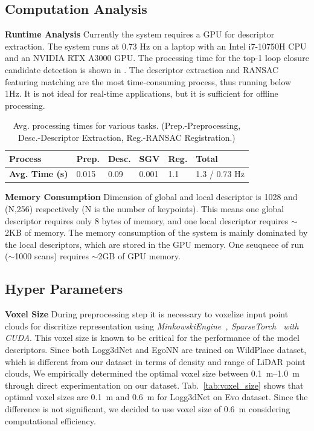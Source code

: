 \subsection*{Computation Analysis}
\textbf{Runtime Analysis}\hspace{0.5em} Currently the system requires a GPU for descriptor extraction. The system runs at 0.73 Hz on a laptop with an Intel i7-10750H CPU and an NVIDIA RTX A3000 GPU. The processing time for the top-1 loop closure candidate detection is shown in . The descriptor extraction and RANSAC featuring matching are the most time-consuming process, thus running below 1Hz. It is not ideal for real-time applications, but it is sufficient for offline processing. 
\begin{table}[h]
  \centering
  \small
  \begin{tabular}{@{}llllll@{}}
  \toprule
  \textbf{Process} & \textbf{Prep.} & \textbf{Desc.} & \textbf{SGV} & \textbf{Reg.} & \textbf{Total} \\ \midrule
  \textbf{Avg. Time (s)} & 0.015 & 0.09 & 0.001 & 1.1 & 1.3 / 0.73 Hz \\
  \bottomrule
  \end{tabular}
  \caption{Avg. processing times for various tasks. (Prep.-Preprocessing, Desc.-Descriptor Extraction, Reg.-RANSAC Registration.)}
  \label{tab:my-table}
\end{table}
\newline
\textbf{Memory Consumption}\hspace{0.5em} Dimension of global and local descriptor is 1028 and (N,256) respectively (N is the number of keypoints). This means one global descriptor requires only 8 bytes of memory, and one local descriptor requires $\sim$2KB of memory. The memory consumption of the system is mainly dominated by the local descriptors, which are stored in the GPU memory. One seuqnece of run ($\sim$1000 scans) requires $\sim$2GB of GPU memory.

\subsection*{Hyper Parameters}
\textbf{Voxel Size}\hspace{0.5em} During preprocessing step it is necessary to voxelize input point clouds for discritize representation using \emph{MinkowskiEngine~\cite{choy20194cvpr}, SparseTorch~\cite{tang2023MICRO} with CUDA}. This voxel size is known to be critical for the performance of the model descriptors. Since both Logg3dNet and EgoNN are trained on WildPlace dataset, which is different from our dataset in terms of density and range of LiDAR point clouds, We empirically determined the optimal voxel size between \SIrange{0.1}{1.0}{\meter} through direct experimentation on our dataset. Tab.~\ref{tab:voxel_size} shows that optimal voxel sizes are \SI{0.1}{\meter} and \SI{0.6}{\meter} for Logg3dNet on Evo dataset. Since the difference is not significant, we decided to use voxel size of \SI{0.6}{\meter} considering computational efficiency.\\

